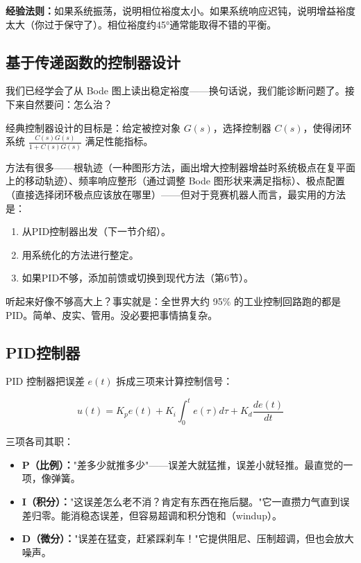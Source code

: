 \textbf{经验法则：}如果系统振荡，说明相位裕度太小。如果系统响应迟钝，说明增益裕度太大（你过于保守了）。相位裕度约45°通常能取得不错的平衡。

\subsection{基于传递函数的控制器设计}

我们已经学会了从 Bode 图上读出稳定裕度——换句话说，我们能诊断问题了。接下来自然要问：怎么治？

经典控制器设计的目标是：给定被控对象 $G(s)$，选择控制器 $C(s)$，使得闭环系统 $\frac{C(s)G(s)}{1+C(s)G(s)}$ 满足性能指标。

方法有很多——根轨迹（一种图形方法，画出增大控制器增益时系统极点在复平面上的移动轨迹）、频率响应整形（通过调整 Bode 图形状来满足指标）、极点配置（直接选择闭环极点应该放在哪里）——但对于竞赛机器人而言，最实用的方法是：

\begin{enumerate}
    \item 从PID控制器出发（下一节介绍）。
    \item 用系统化的方法进行整定。
    \item 如果PID不够，添加前馈或切换到现代方法（第6节）。
\end{enumerate}

听起来好像不够高大上？事实就是：全世界大约 95\% 的工业控制回路跑的都是 PID。简单、皮实、管用。没必要把事情搞复杂。

\subsection{PID控制器}

PID 控制器把误差 $e(t)$ 拆成三项来计算控制信号：

\begin{equation}
u(t) = K_p e(t) + K_i \int_0^t e(\tau) d\tau + K_d \frac{de(t)}{dt}
\end{equation}

三项各司其职：

\begin{itemize}
    \item \textbf{P（比例）：}"差多少就推多少"——误差大就猛推，误差小就轻推。最直觉的一项，像弹簧。
    \item \textbf{I（积分）：}"这误差怎么老不消？肯定有东西在拖后腿。"它一直攒力气直到误差归零。能消稳态误差，但容易超调和积分饱和（windup）。
    \item \textbf{D（微分）：}"误差在猛变，赶紧踩刹车！"它提供阻尼、压制超调，但也会放大噪声。
\end{itemize}

